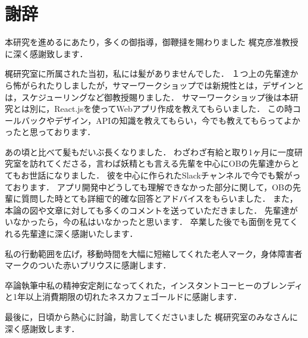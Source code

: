 \chapter*{謝辞}

本研究を進めるにあたり，多くの御指導，御鞭撻を賜わりました
梶克彦准教授に深く感謝致します．

梶研究室に所属された当初，私には髪がありませんでした．
１つ上の先輩達から怖がられたりしましたが，サマーワークショップでは新規性とは，デザインとは，スケジューリングなど御教授賜りました．
サマーワークショップ後は本研究とは別に，React.jsを使ってWebアプリ作成を教えてもらいました．
この時コールバックやデザイン，APIの知識を教えてもらい，今でも教えてもらってよかったと思っております．

あの頃と比べて髪もだいぶ長くなりました．
わざわざ有給と取り1ヶ月に一度研究室を訪れてくださる，言わば妖精とも言える先輩を中心にOBの先輩達からとてもお世話になりました．
彼を中心に作られたSlackチャンネルで今でも繋がっております．
アプリ開発中どうしても理解できなかった部分に関して，OBの先輩に質問した時とても詳細で的確な回答とアドバイスをもらいました．
また，本論の図や文章に対しても多くのコメントを送っていただきました．
先輩達がいなかったら，今の私はいなかったと思います．
卒業した後でも面倒を見てくれる先輩達に深く感謝いたします．

私の行動範囲を広げ，移動時間を大幅に短縮してくれた老人マーク，身体障害者マークのついた赤いプリウスに感謝します．

卒論執筆中私の精神安定剤になってくれた，インスタントコーヒーのブレンディと1年以上消費期限の切れたネスカフェゴールドに感謝します．

最後に，日頃から熱心に討論，助言してくださいました
梶研究室のみなさんに深く感謝致します．



